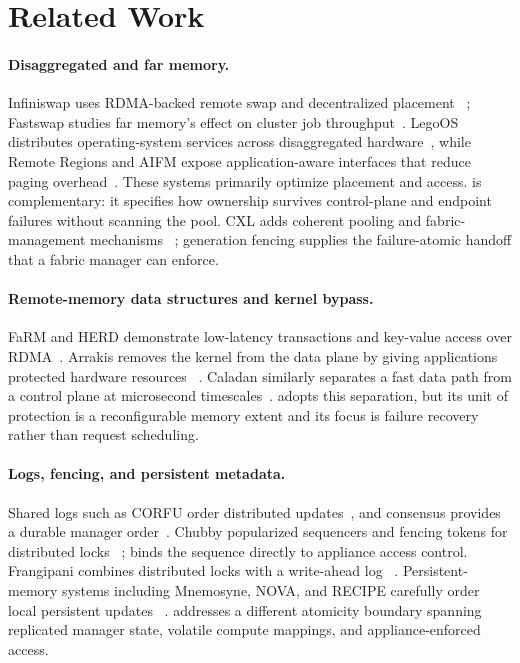 \section{Related Work}
\label{sec:related}

\paragraph{Disaggregated and far memory.}
Infiniswap uses RDMA-backed remote swap and decentralized placement
~\cite{gu2017infiniswap}; Fastswap studies far memory's effect on cluster job
throughput~\cite{amaro2020fastswap}. LegoOS distributes operating-system
services across disaggregated hardware~\cite{shan2018legoos}, while Remote
Regions and AIFM expose application-aware interfaces that reduce paging
overhead~\cite{aguilera2018remote,ruan2020aifm}. These systems primarily
optimize placement and access. \system is complementary: it specifies how
ownership survives control-plane and endpoint failures without scanning the
pool. CXL adds coherent pooling and fabric-management mechanisms
~\cite{cxl2022spec}; generation fencing supplies the failure-atomic handoff
that a fabric manager can enforce.

\paragraph{Remote-memory data structures and kernel bypass.}
FaRM and HERD demonstrate low-latency transactions and key-value access over
RDMA~\cite{dragojevic2014farm,kalia2014herd}. Arrakis removes the kernel from
the data plane by giving applications protected hardware resources
~\cite{peter2014arrakis}. Caladan similarly separates a fast data path from a
control plane at microsecond timescales~\cite{fried2020caladan}. \system adopts
this separation, but its unit of protection is a reconfigurable memory extent
and its focus is failure recovery rather than request scheduling.

\paragraph{Logs, fencing, and persistent metadata.}
Shared logs such as CORFU order distributed updates~\cite{balakrishnan2012corfu},
and consensus provides a durable manager order~\cite{ongaro2014raft}. Chubby
popularized sequencers and fencing tokens for distributed locks
~\cite{burrows2006chubby}; \system binds the sequence directly to appliance
access control. Frangipani combines distributed locks with a write-ahead log
~\cite{thekkath1997frangipani}. Persistent-memory systems including Mnemosyne,
NOVA, and RECIPE carefully order local persistent updates
~\cite{volos2011mnemosyne,xu2016nova,lee2019recipe}. \system addresses a
different atomicity boundary spanning replicated manager state, volatile
compute mappings, and appliance-enforced access.
